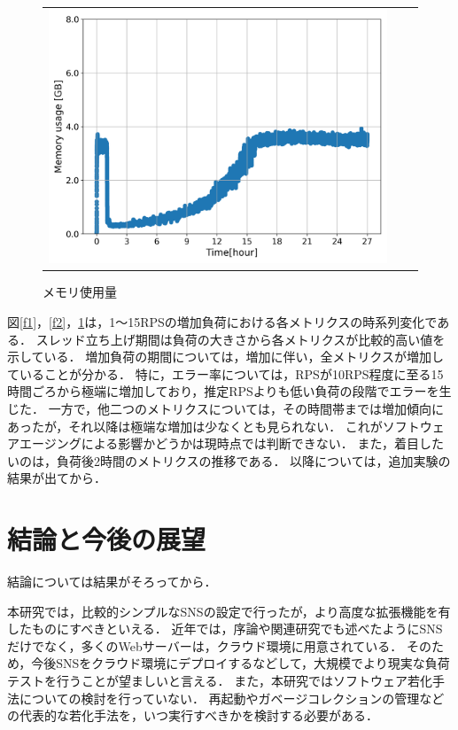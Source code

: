 \documentclass[twoside,twocolumn,10pt]{jarticle}  %
\begin{document}
\begin{figure}[H]
\begin{tabular}{rrr}
\begin{minipage}{.164\textwidth}
          \caption{CPU使用率}
          \label{f2}
      \end{minipage}
      \begin{minipage}{.164\textwidth}
          \centering
          \includegraphics[width=1.0\linewidth]{figures/8core_1_15rps_increase_mem.png}
          \caption{メモリ使用量}
          \label{f3}
      \end{minipage}
  \end{tabular}
\end{figure}

図\ref{f1}，\ref{f2}，\ref{f3}は，1～15RPSの増加負荷における各メトリクスの時系列変化である．
スレッド立ち上げ期間は負荷の大きさから各メトリクスが比較的高い値を示している．
増加負荷の期間については，増加に伴い，全メトリクスが増加していることが分かる．
特に，エラー率については，RPSが10RPS程度に至る15時間ごろから極端に増加しており，推定RPSよりも低い負荷の段階でエラーを生じた．
一方で，他二つのメトリクスについては，その時間帯までは増加傾向にあったが，それ以降は極端な増加は少なくとも見られない．
これがソフトウェアエージングによる影響かどうかは現時点では判断できない．
また，着目したいのは，負荷後2時間のメトリクスの推移である．
以降については，追加実験の結果が出てから．

\section{結論と今後の展望}
結論については結果がそろってから．\par
本研究では，比較的シンプルなSNSの設定で行ったが，より高度な拡張機能を有したものにすべきといえる．
近年では，序論や関連研究でも述べたようにSNSだけでなく，多くのWebサーバーは，クラウド環境に用意されている．
そのため，今後SNSをクラウド環境にデプロイするなどして，大規模でより現実な負荷テストを行うことが望ましいと言える．
また，本研究ではソフトウェア若化手法についての検討を行っていない．
再起動やガベージコレクションの管理などの代表的な若化手法を，いつ実行すべきかを検討する必要がある．
\end{document}
